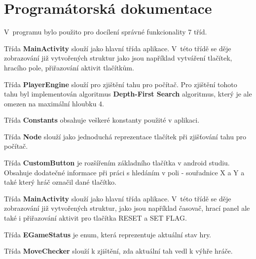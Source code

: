 \documentclass[12pt, a4paper]{article}
\begin{document}
\section{Programátorská dokumentace}
V~programu bylo použito pro docílení správné funkcionality 7 tříd.
\par
Třída \textbf{MainActivity} slouží jako hlavní třída aplikace. V~této třídě se děje zobrazování již vytvořených struktur jako jsou například vytváření tlačítek, hracího pole, přiřazování aktivit tlačítkům.
\par
Třída \textbf{PlayerEngine} slouží pro zjištění tahu pro počítač. Pro zjištění tohoto tahu byl implementován algoritmus \textbf{Depth-First Search} algoritmus, který je ale omezen na maximální hloubku 4.
\par
Třída \textbf{Constants} obsahuje veškeré konstanty použité v aplikaci.
\par
Třída \textbf{Node} slouží jako jednoduchá reprezentace tlačítek při zjišťování tahu pro počítač.
\par
Třída \textbf{CustomButton} je rozšířením základního tlačítka v android studiu. Obsahuje dodatečné informace při práci s hledáním v poli - souřadnice X a Y a také který hráč označil dané tlačítko.
\par
Třída \textbf{MainActivity} slouží jako hlavní třída aplikace. V~této třídě se děje zobrazování již vytvořených struktur, jako jsou například časovač, hrací panel ale také i přiřazování aktivit pro tlačítka RESET a SET FLAG.
\par
Třída \textbf{EGameStatus} je enum, která reprezentuje aktuální stav hry.
\par
Třída \textbf{MoveChecker} slouží k zjištění, zda aktuální tah vedl k výhře hráče. 
\newpage
\end{document}
